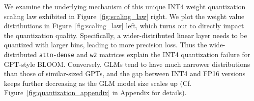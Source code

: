 We examine the underlying mechanism of this unique INT4 weight quantization scaling law exhibited in Figure~\ref{fig:scaling_law} right. %
We plot the weight value distributions in  Figure~\ref{fig:scaling_law} left, which turns out to directly impact the quantization quality.
Specifically, a wider-distributed linear layer needs to be quantized with larger bins, leading to more precision loss.
Thus the wide-distributed \texttt{attn-dense} and \texttt{w2} matrices explain the INT4 quantization failure for GPT-style BLOOM.
Conversely, GLMs tend to have much narrower distributions than those of similar-sized GPTs, and the gap between INT4 and FP16 versions keeps further decreasing as the GLM model size scales up (Cf.  Figure~\ref{fig:quantization_appendix} in Appendix for details).

